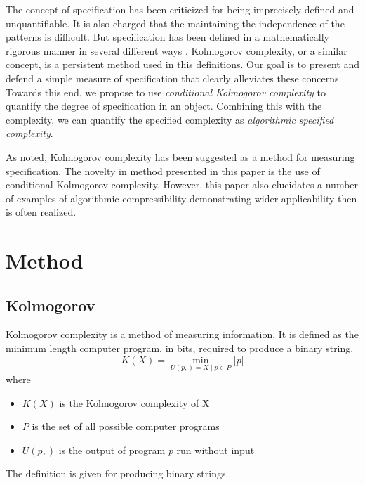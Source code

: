 The concept of specification has been criticized for being imprecisely defined and unquantifiable.
It is also charged that the maintaining the independence of the patterns is difficult.
But specification has been defined in a mathematically rigorous manner in several different ways \cite{Dembski1998, Dembski2002, Dembski2005a}.
Kolmogorov complexity, or a similar concept, is a persistent method used in this definitions.
Our goal is to present and defend a simple measure of specification that clearly alleviates these concerns.
Towards this end, we propose to use \textit{conditional Kolmogorov complexity} to quantify the degree of specification in an object.
Combining this with the complexity, we can quantify the specified complexity as \textit{algorithmic specified complexity}.

As noted, Kolmogorov complexity has been suggested as a method for measuring specification.
The novelty in method presented in this paper is the use of conditional Kolmogorov complexity.
However, this paper also elucidates a number of examples of algorithmic compressibility demonstrating wider applicability then is often realized.

\section{Method}

\subsection{Kolmogorov}

Kolmogorov complexity is a method of measuring information.
It is defined as the minimum length computer program, in bits, required to produce a binary string.
\begin{equation}
    K(X) = \min_{U(p,) = X \mid p \in P} |p|
\end{equation} where
\begin{itemize}
    \item $K(X)$ is the Kolmogorov complexity of X
    \item $P$ is the set of all possible computer programs
    \item $U(p,)$ is the output of program $p$ run without input
\end{itemize}
The definition is given for producing binary strings.

